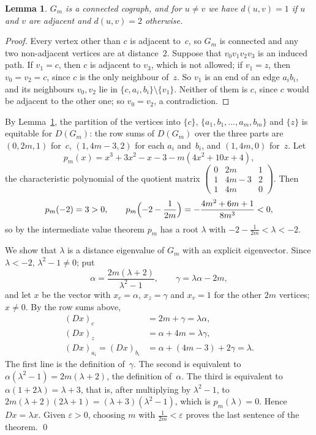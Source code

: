 \documentclass[11pt]{article}
\newtheorem{lemma}{Lemma}
\theoremstyle{remark}
\begin{document}
\begin{lemma}\label{lem:struct}
$G_m$ is a connected cograph, and for $u\ne v$ we have $d(u,v)=1$ if $u$ and
$v$ are adjacent and $d(u,v)=2$ otherwise.
\end{lemma}

\begin{proof}
Every vertex other than $c$ is adjacent to~$c$, so $G_m$ is connected and any
two non-adjacent vertices are at distance~$2$. Suppose that $v_0v_1v_2v_3$ is an
induced path. If $v_1=c$, then $c$ is adjacent to $v_3$, which is not allowed;
if $v_1=z$, then $v_0=v_2=c$, since $c$ is the only neighbour of~$z$. So
$v_1$ is an end of an edge $a_ib_i$, and its neighbours $v_0,v_2$ lie in
$\{c,a_i,b_i\}\setminus\{v_1\}$. Neither of them is $c$, since $c$ would be
adjacent to the other one; so $v_0=v_2$, a contradiction.
\end{proof}

By Lemma~\ref{lem:struct}, the partition of the vertices into $\{c\}$,
$\{a_1,b_1,\dots,a_m,b_m\}$ and $\{z\}$ is equitable for $D(G_m)$: the row sums
of $D(G_m)$ over the three parts are $(0,2m,1)$ for~$c$, $(1,4m-3,2)$ for each
$a_i$ and~$b_i$, and $(1,4m,0)$ for~$z$. Let
\[
p_m(x)=x^3+3x^2-x-3-m(4x^2+10x+4),
\]
the characteristic polynomial of the quotient matrix
$\left(\begin{smallmatrix}0&2m&1\\1&4m-3&2\\1&4m&0\end{smallmatrix}\right)$.
Then
\[
p_m(-2)=3>0,\qquad
p_m\Bigl(-2-\frac1{2m}\Bigr)=-\frac{4m^2+6m+1}{8m^3}<0,
\]
so by the intermediate value theorem $p_m$ has a root $\lambda$ with
$-2-\frac1{2m}<\lambda<-2$.

We show that $\lambda$ is a distance eigenvalue of $G_m$ with an explicit
eigenvector. Since $\lambda<-2$, $\lambda^2-1\ne0$; put
\[
\alpha=\frac{2m(\lambda+2)}{\lambda^2-1},\qquad \gamma=\lambda\alpha-2m,
\]
and let $x$ be the vector with $x_c=\alpha$, $x_z=\gamma$ and $x_v=1$ for the
other $2m$ vertices; $x\ne0$. By the row sums above,
\begin{align*}
(D x)_c&=2m+\gamma=\lambda\alpha,\\
(D x)_z&=\alpha+4m=\lambda\gamma,\\
(D x)_{a_i}=(D x)_{b_i}&=\alpha+(4m-3)+2\gamma=\lambda.
\end{align*}
The first line is the definition of~$\gamma$. The second is equivalent to
$\alpha(\lambda^2-1)=2m(\lambda+2)$, the definition of~$\alpha$. The third is
equivalent to $\alpha(1+2\lambda)=\lambda+3$, that is, after multiplying by
$\lambda^2-1$, to $2m(\lambda+2)(2\lambda+1)=(\lambda+3)(\lambda^2-1)$, which is
$p_m(\lambda)=0$. Hence $Dx=\lambda x$. Given $\varepsilon>0$, choosing $m$
with $\frac1{2m}<\varepsilon$ proves the last sentence of the theorem.
\qed
\end{document}
